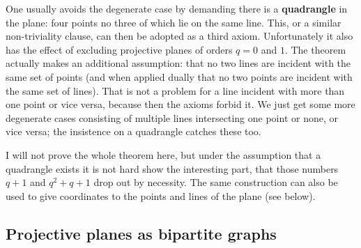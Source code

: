 \documentclass[12pt]{article}
\begin{document}
%
One usually avoids the degenerate case by demanding there is a {\bf quadrangle}
in the plane: four {\sc point}s no three of which lie on the same {\sc line}. This, or a
similar non-triviality clause, can then be adopted as a third axiom.
Unfortunately it also has the effect of excluding projective planes of orders $q=0$ and $1$. The
theorem actually makes an additional assumption: that
no two lines are incident with the same set of points (and when applied dually
that no two points are incident with the same set of lines). That is not a
problem for a {\sc line} incident with more than one {\sc point} or vice versa, because
then the axioms forbid it. We just get some more degenerate cases consisting
of multiple lines intersecting one point or none, or vice versa; the insistence
on a quadrangle catches these too.

I will not prove the whole theorem here, but under the assumption
that a quadrangle exists it is not hard show the interesting part,
that those numbers $q+1$ and $q^2+q+1$ drop out by necessity.
The same construction can also be used to give coordinates to the
{\sc point}s and {\sc line}s of the plane (see below).

\clearpage
\subsection*{Projective planes as bipartite graphs}
\end{document}
